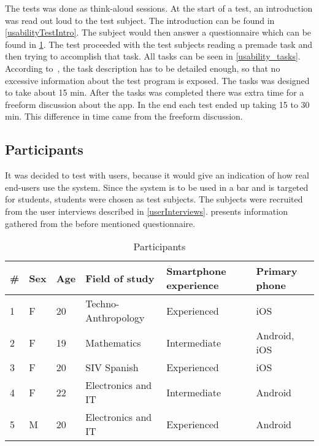 The tests was done as think-aloud sessions. At the start of a test, an introduction was read out loud to the test
subject. The introduction can be found in
\cref{usabilityTestIntro}. The subject would then answer a
questionnaire which can be found in \cref{tab:participants}. The test
proceeded with the test subjects reading a premade task and then
trying to accomplish that task. All tasks can be seen in \cref{usability_tasks}. According to~\cite{RubinChisnellSpool08}, the task description has to be detailed enough, so that no excessive information about the test program is exposed. The tasks was designed to take about 15 min. After the tasks was completed there was extra time for a freeform discussion about the app. In the end each test ended up taking 15 to 30 min. This difference in time came from the freeform discussion.

\subsection{Participants}
It was decided to test with users, because it would give an indication
of how real end-users use the system. Since the system is to be used
in a bar and is targeted for students, students were chosen as test
subjects. The subjects were recruited from the user interviews
described in \cref{userInterviews}.  presents
information gathered from the before mentioned questionnaire.

\begin{table}[h]
\begin{tabular}{|l|l|l|l|l|l|}
\hline
\textbf{\#} & \textbf{Sex} & \textbf{Age} & \textbf{Field of study} & \textbf{Smartphone experience} & \textbf{Primary phone} \\ \hline
1                   & F               & 20           & Techno-Anthropology       & Experienced                    & iOS                    \\ \hline
2                   & F               & 19           & Mathematics             & Intermediate                   & Android, iOS           \\ \hline
3                   & F               & 20           & SIV Spanish             & Experienced                    & iOS                    \\ \hline
4                   & F               & 22           & Electronics and IT      & Intermediate                   & Android                \\ \hline
5                   & M               & 20           & Electronics and IT      & Experienced                    & Android                \\ \hline
\end{tabular}
\caption{Participants}\label{tab:participants}
\end{table}

